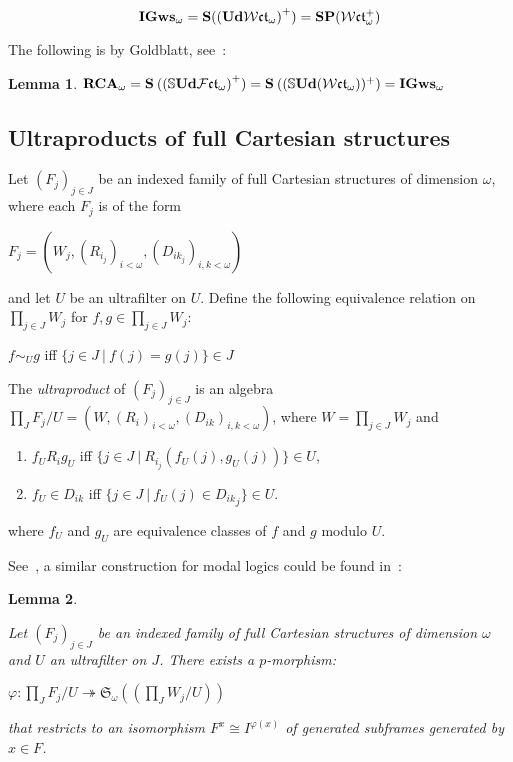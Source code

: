 \documentclass{article}
\theoremstyle{defin}
\theoremstyle{theorem}
\theoremstyle{claim}
\theoremstyle{prop}
\theoremstyle{lemma}
\newtheorem{lemma}{Lemma}
\theoremstyle{fact}
\theoremstyle{remark}
\theoremstyle{ex}
\theoremstyle{col}
\theoremstyle{question}
\begin{document}
\begin{equation}
{\bf IGws}_{\omega} = {\bf S} ({({\bf Ud} \mathcal{W}\mathfrak{ct}_{\omega})}^+) = {\bf S P} (\mathcal{W}\mathfrak{ct}_{\omega}^{+})
\end{equation}

The following is by Goldblatt, see~\cite[Lemma 3.4]{goldblatt1995elementary}:
\begin{lemma}
${\bf RCA}_{\omega} = {\bf S} \: ({(\mathbb{S} {\bf Ud} \mathcal{F}\mathfrak{ct}_{\omega})}^{+}) = {\bf S} \: ((\mathbb{S} {\bf Ud} (\mathcal{W}\mathfrak{ct}_{\omega}))^{+}) = {\bf IGws}_{\omega}$
\end{lemma}

\subsection{Ultraproducts of full Cartesian structures}

Let ${(F_j)}_{j \in J}$ be an indexed family of full Cartesian structures of dimension $\omega$, 
where each $F_j$ is of the form 
\begin{center}
$F_j = (W_j, {(R_{i_j})}_{i < \omega}, {(D_{{ik}_j})}_{i, k < \omega})$
\end{center}
and let $U$ be an ultrafilter on $U$. 
Define the following equivalence relation on 
$\prod \limits_{j \in J} W_j$ for $f, g \in \prod \limits_{j \in J} W_j$:
\begin{center}
$f \sim_{U} g$ iff $\{ j \in J \: | \: f(j) = g(j) \} \in J$
\end{center}
The \emph{ultraproduct} of ${(F_j)}_{j \in J}$ is an algebra 
$\prod \limits_{J} F_j / U = (W, {(R_i)}_{i < \omega}, {(D_{ik})}_{i, k < \omega})$, 
where $W = \prod \limits_{j \in J} W_j$ and
\begin{enumerate}
\item $f_U R_i g_U$ iff $\{ j \in J \: | \: R_{i_j}(f_U(j), g_U(j)) \} \in U$,
\item $f_U \in D_{ik}$ iff $\{ j \in J \: | \: f_U(j) \in {D_{ik}}_j \} \in U$.
\end{enumerate}
where $f_U$ and $g_U$ are equivalence classes of $f$ and $g$ modulo $U$.

See~\cite[Lemma 3.5]{goldblatt1995elementary}, 
a similar construction for modal logics could be found in~\cite{fine1975some}:
\begin{lemma}~\label{ultrapmor}

Let ${(F_j)}_{j \in J}$ be an indexed family of full Cartesian structures of dimension 
$\omega$ and $U$ an ultrafilter on $J$. There exists a $p$-morphism:

\begin{center}
$\varphi : \prod \limits_{J} F_j / U \twoheadrightarrow \mathfrak{S}_{\omega}((\prod \limits_{J} W_j / U))$
\end{center}
that restricts to an isomorphism $F^x \cong I^{\varphi(x)}$ of generated subframes generated by $x \in F$.
\end{lemma}
\end{document}
